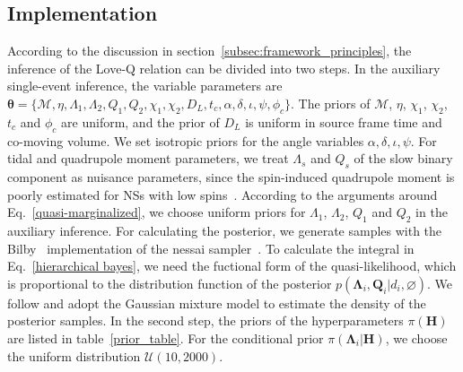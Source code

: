 \documentclass[a4paper,11pt]{article}
\begin{document}
\subsection{Implementation}
\label{subsec:simulation_implementation}

According to the discussion in section~\ref{subsec:framework_principles}, the inference of the Love-Q relation
can be divided into two steps.
In the auxiliary single-event inference, the variable parameters are $\bm{\theta} = \{\mathcal{M},\eta,
\Lambda_1,\Lambda_2,Q_1,Q_2,\chi_1,\chi_2,D_L,t_c,\alpha,\delta,\iota,\psi,\phi_c\}
$. The priors of $\mathcal{M}$, $\eta$, $\chi_1$, $\chi_2$, $t_c$ and $\phi_c$ are uniform, and
the prior of $D_L$ is uniform in source frame time and co-moving volume. We 
set isotropic priors for the angle variables $\alpha,\delta,\iota,\psi$. For tidal 
and quadrupole moment parameters, we treat $\Lambda_s$ and $Q_s$ of the slow 
binary component as nuisance parameters, since the spin-induced 
quadrupole moment is poorly estimated for NSs with low spins~\cite{Yagi:2013awa}.
According to the arguments around Eq.~\eqref{quasi-marginalized}, we choose
uniform priors for $\Lambda_1$, $\Lambda_2$, $Q_1$ and $Q_2$ in the auxiliary inference.
For calculating the posterior, we generate samples with the {\sc
Bilby}~\cite{Ashton:2018jfp} implementation of the {\sc nessai}
sampler~\cite{Skilling:2004pqw,Skilling:2006gxv,michael_j_williams_2025_14627250,PhysRevD.103.103006,Williams:2023ppp}.
To calculate the integral in Eq.~\eqref{hierarchical bayes}, we need the
fuctional form of the quasi-likelihood, which is proportional to the
distribution function of the posterior
$p(\bm{\Lambda}_i,\bm{Q}_i|d_i,\varnothing)$. We follow
\citet{Golomb:2021tll} and adopt the Gaussian mixture 
model to estimate the density of the posterior samples.
In the second step, the priors of the hyperparameters $\pi(\bm{H})$ are listed
in table~\ref{prior_table}. For the conditional prior $\pi(\bm
{\Lambda}_i|\bm{H})$, we choose the uniform distribution $\mathcal{U}(10,2000)$. 
\end{document}
